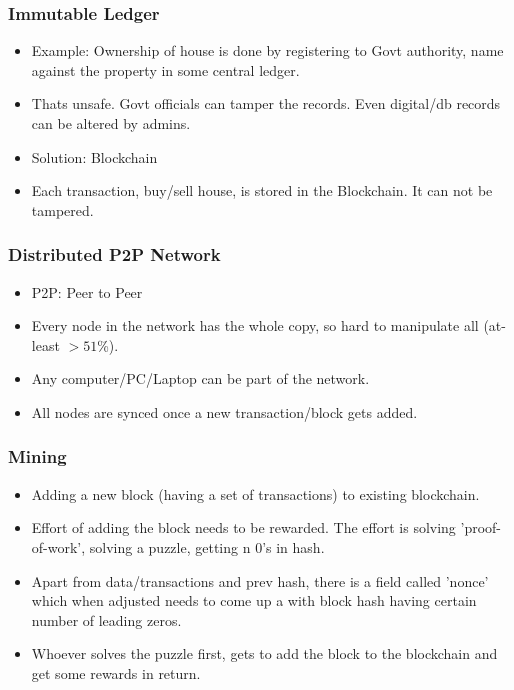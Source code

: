 \begin{frame}[fragile]\frametitle{Immutable Ledger}
\begin{itemize}
\item Example: Ownership of house is done by registering to Govt authority, name against the property in some central ledger.
\item Thats unsafe. Govt officials can tamper the records. Even digital/db records can be altered by admins.
\item Solution: Blockchain
\item Each transaction, buy/sell house, is stored in the Blockchain. It can not be tampered.
\end{itemize}

\end{frame}

\begin{frame}[fragile]\frametitle{Distributed P2P Network}
\begin{itemize}
\item P2P: Peer to Peer
\item Every node in the network has the whole copy, so hard to manipulate all (at-least $> 51$\%).
\item Any computer/PC/Laptop can be part of the network.
\item All nodes are synced once a new transaction/block gets added.
\end{itemize}

\end{frame}

\begin{frame}[fragile]\frametitle{Mining}
\begin{itemize}
\item Adding a new block (having a set of transactions) to existing blockchain.
\item Effort of adding the block needs to be rewarded. The effort is solving 'proof-of-work', solving a puzzle, getting n 0's in hash.
\item Apart from data/transactions and prev hash, there is a field called 'nonce' which when adjusted needs to come up a with block hash having certain number of leading zeros.
\item Whoever solves the puzzle first, gets to add the block to the blockchain and get some rewards in return.
\end{itemize}

\end{frame}
